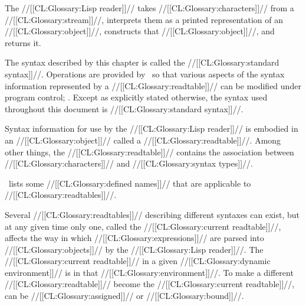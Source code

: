

The //[[CL:Glossary:Lisp reader]]// takes //[[CL:Glossary:characters]]// from a //[[CL:Glossary:stream]]//,  interprets them as a printed representation of an //[[CL:Glossary:object]]//, constructs that //[[CL:Glossary:object]]//, and returns it.

 The syntax described by this chapter is called the //[[CL:Glossary:standard syntax]]//. Operations are provided by \clisp\ so that various aspects of the syntax information represented by a //[[CL:Glossary:readtable]]//  can be modified under program control; \seechapter\Reader. Except as explicitly stated otherwise,  the syntax used throughout this document is //[[CL:Glossary:standard syntax]]//.

 

Syntax information for use by the //[[CL:Glossary:Lisp reader]]// is embodied in an //[[CL:Glossary:object]]// called a //[[CL:Glossary:readtable]]//.  Among other things,  the //[[CL:Glossary:readtable]]// contains the association between //[[CL:Glossary:characters]]//  and //[[CL:Glossary:syntax types]]//.

\Thenextfigure\ lists some //[[CL:Glossary:defined names]]// that are applicable to //[[CL:Glossary:readtables]]//.


 

Several //[[CL:Glossary:readtables]]// describing different syntaxes can exist, but at any given time only one, called the //[[CL:Glossary:current readtable]]//,  affects the way in which //[[CL:Glossary:expressions]]// are parsed  into //[[CL:Glossary:objects]]// by the //[[CL:Glossary:Lisp reader]]//. The //[[CL:Glossary:current readtable]]// in a given //[[CL:Glossary:dynamic environment]]// is  in that //[[CL:Glossary:environment]]//. To make a different //[[CL:Glossary:readtable]]// become the //[[CL:Glossary:current readtable]]//,  can be //[[CL:Glossary:assigned]]// or //[[CL:Glossary:bound]]//.

\endsubsubsection%

